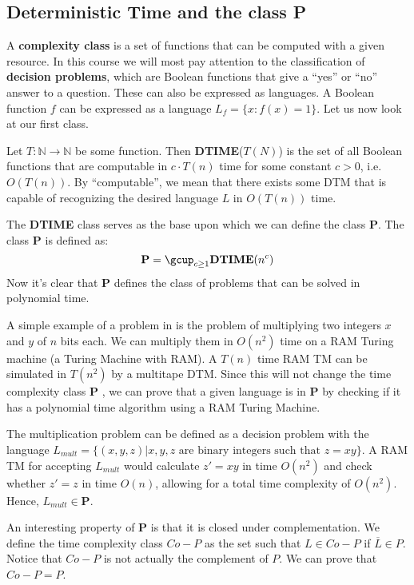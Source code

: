 \documentclass[12pt,letterpaper]{article}
\theoremstyle{definition}
\newcommand{\N}{\mathbb{N}}
\begin{document}
\subsection{Deterministic Time and the class P}

A \textbf{complexity class}  is a set of functions that can be computed with a given resource. In this course we will most pay attention to the classification of \textbf{decision problems}, which are Boolean functions that give a ``yes'' or ``no'' answer to a question. These can also be expressed as languages. A Boolean function $f$ can be expressed as a language $L_f = \{x : f(x) = 1\}$. Let us now look at our first class.

Let $T : \N \rightarrow \N$ be some function. Then \textbf{DTIME}($T(N)$) is the set of all Boolean functions that are computable in $c \cdot T(n)$ time for some constant $c > 0$, i.e. $O(T(n))$. By ``computable'', we mean that there exists some DTM that is capable of recognizing the desired language $L$ in $O(T(n))$ time.

The \textbf{DTIME}  class serves as the base upon which we can define the class \textbf{P}. The class \textbf{P} is defined as:
\[\mathbf{P} = \gcup_{c \geq 1} \mathbf{DTIME}(n^c)\]
Now it's clear that \textbf{P} defines the class of problems that can be solved in polynomial time.

A simple example of a problem in  is the problem of multiplying two integers $x$ and $y$ of $n$ bits each. We can multiply them in $O(n^2)$ time on a RAM Turing machine (a Turing Machine with RAM). A $T(n)$ time RAM TM can be simulated in $T(n^2)$ by a multitape DTM. Since this will not change the time complexity class \textbf{P} , we can prove that a given language is in \textbf{P} by checking if it has a polynomial time algorithm using a RAM Turing Machine.

The multiplication problem can be defined as a decision problem with the language $L_{mult} = \{(x,y,z)|x,y,z \text{ are binary integers such that } z = xy\}$. A RAM TM for accepting $L_{mult}$ would calculate $z' = xy$ in time $O(n^2)$ and check whether $z' = z$ in time $O(n)$, allowing for a total time complexity of $O(n^2)$. Hence, $L_{mult} \in \mathbf{P}$.

An interesting property of \textbf{P} is that it is closed under complementation. We define the time complexity class $Co-P$ as the set such that $L \in Co-P$ if $\overline{L} \in P$. Notice that $Co-P$ is not actually the complement of $P$. We can prove that $Co-P = P$.
\end{document}
